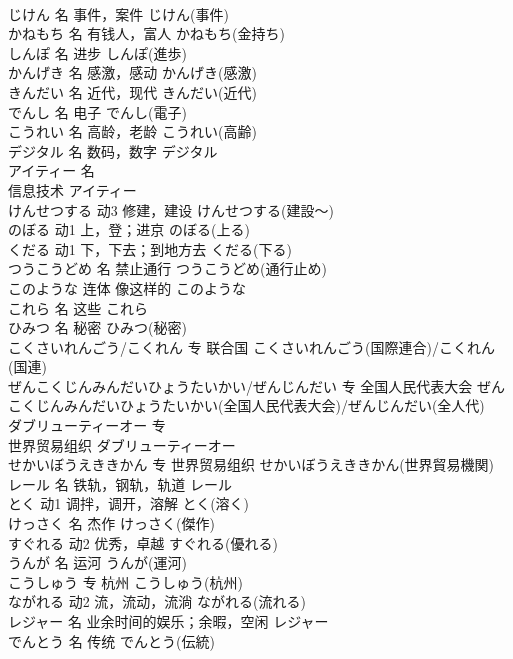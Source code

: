 \documentclass[8pt]{extreport}
\begin{document}
\begin{CJK}{UTF8}{min}
\\	じけん	名	事件，案件	じけん(事件)	
\\	かねもち	名	有钱人，富人	かねもち(金持ち)	
\\	しんぽ	名	进步	しんぽ(進歩)	
\\	かんげき	名	感激，感动	かんげき(感激)	
\\	きんだい	名	近代，现代	きんだい(近代)	
\\	でんし	名	电子	でんし(電子)	
\\	こうれい	名	高龄，老龄	こうれい(高齢)	
\\	デジタル	名	数码，数字	デジタル	
\\	アイティー	名	
\\	信息技术	アイティー
\\	けんせつする	动3	修建，建设	けんせつする(建設～)	
\\	のぼる	动1	上，登；进京	のぼる(上る)	
\\	くだる	动1	下，下去；到地方去	くだる(下る)	
\\	つうこうどめ	名	禁止通行	つうこうどめ(通行止め)	
\\	このような	连体	像这样的	このような	
\\	これら	名	这些	これら	
\\	ひみつ	名	秘密	ひみつ(秘密)	
\\	こくさいれんごう/こくれん	专	联合国	こくさいれんごう(国際連合)/こくれん(国連)	
\\	ぜんこくじんみんだいひょうたいかい/ぜんじんだい	专	全国人民代表大会	ぜんこくじんみんだいひょうたいかい(全国人民代表大会)/ぜんじんだい(全人代)	
\\	ダブリューティーオー	专	
\\	世界贸易组织	ダブリューティーオー
\\	せかいぼうえききかん	专	世界贸易组织	せかいぼうえききかん(世界貿易機関)	
\\	レール	名	铁轨，钢轨，轨道	レール	
\\	とく	动1	调拌，调开，溶解	とく(溶く)	
\\	けっさく	名	杰作	けっさく(傑作)	
\\	すぐれる	动2	优秀，卓越	すぐれる(優れる)	
\\	うんが	名	运河	うんが(運河)	
\\	こうしゅう	专	杭州	こうしゅう(杭州)	
\\	ながれる	动2	流，流动，流淌	ながれる(流れる)	
\\	レジャー	名	业余时间的娱乐；余暇，空闲	レジャー	
\\	でんとう	名	传统	でんとう(伝統)	

\end{CJK}
\end{document}
